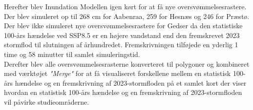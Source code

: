 Herefter blev Inundation Modellen igen kørt for at få nye oversvømmelsesrastere. Der blev simuleret op til 268 cm for Aabenraa, 259 for Hesnæs og 246 for Præstø. Der blev ikke simuleret nye oversvømmelsesrastere for Gedser da den statistiske 100-års hændelse ved SSP8.5 er en højere vandstand end den fremskrevet 2023 stormflod til slutningen af århundredet. Fremskrivningen tilføjede en yderlig 1 time og 58 minutter til samlet simuleringstid.\\


Derefter blev alle oversvømmelsesrasterne konverteret til polygoner og kombineret med værktøjet \textit{"Merge"} for at få visualiseret forskellene mellem en statistisk 100-års hændelse og en fremskrivning af 2023-stormfloden på et samlet kort der viser hvordan en statistisk 100-års hændelse og en fremskrivning af 2023-stormfloden vil påvirke studieområderne.